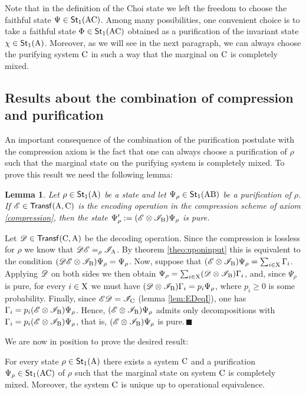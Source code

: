 \documentclass[12pt,aps,pra,showpacs,groupedaddress]{revtex4-1}
\newtheorem{lemma}{Lemma} \newtheorem{proposition}{Proposition}
\def\Proof{\medskip\par\noindent{\bf Proof. }}
\def\qed{$\,\blacksquare$\par}
\def\rB{{\rm B}}
\def\rC{{\rm C}}
\def\Stset{{\mathsf{St}}}
\def\Trnset{{\mathsf{Transf}}}
\begin{document}
Note that in the definition of the Choi state we left the freedom to choose the
faithful state $\Psi \in\Stset_1 (\rA\rC)$.  Among many possibilities, one convenient choice is to
take a faithful state $\Phi \in\Stset_1 (\rA\rC)$ obtained as a purification of the invariant state
$\chi \in\Stset_1 (\rA)$. Moreover, as we will see in the next paragraph, we can always choose the
purifying system $\rC$ in such a way that the marginal on $\rC$ is completely
mixed.
  



\subsection{Results about the combination of compression and purification}


An important consequence of the combination of the purification postulate with the compression axiom
is the fact that one can always choose a purification of $\rho$ such that the marginal state on the
purifying system is completely mixed.  To prove this result we need the following lemma:


\begin{lemma}
  Let $\rho \in\Stset_1 (\rA)$ be a state and let $\Psi_\rho \in\Stset_1(\rA\rB)$ be a purification of
  $\rho$.  If $\tE\in\Trnset(\rA,\rC)$ is the encoding operation in the compression scheme of axiom
  \ref{compression}, then the state $\Psi_\rho' := (\tE\otimes\tI_\rB) \Psi_\rho$ is pure.
  \label{lem:pure}
\end{lemma}


\Proof Let $\tD \in \Trnset (\rC, \rA)$ be the decoding operation.  Since the compression is
lossless for $\rho$ we know that $\mathscr D\mathscr E =_\rho \mathscr I_{\rm A}$.  By theorem \ref{theo:uponinput} this is
equivalent to the condition $(\tD\tE\otimes\tI_\rB)\Psi_\rho=\Psi_\rho$.  Now, suppose that
$(\tE\otimes\tI_\rB )\Psi_\rho=\sum_{i\in\rX} \Gamma_i$. Applying $\mathscr D$ on both sides we then obtain
$ \Psi_\rho = \sum_{i \in \rX} (\tD \otimes \tI_\rB) \Gamma_i $, and, since $\Psi_\rho$ is pure, for
every $i \in {\rm X}$ we must have $(\tD\otimes\tI_\rB)\Gamma_i=p_i \Psi_\rho$, where $p_i\ge0$ is some
probability.  Finally, since $\tE\tD=\tI_{\rC}$ (lemma \ref{lem:EDeqI}), one has $\Gamma_i=p_i(
\tE\otimes\tI_\rB)\Psi_\rho$. Hence, $(\tE\otimes\tI_\rB)\Psi_\rho$ admits only decompositions with
$\Gamma_i=p_i (\tE\otimes\tI_\rB) \Psi_\rho$, that is, $(\tE\otimes\tI_\rB) \Psi_\rho$ is pure.\qed
 
 
 We are now in position to prove the desired result: 
\begin{theorem}
  For every state $\rho\in\Stset_1(\rA)$ there exists a system $\rC$ and a purification
  $\Psi_\rho\in\Stset_1(\rA \rC)$ of $\rho$ such that the marginal state on system $\rC$ is
  completely mixed. Moreover, the system $\rC$ is unique up to operational equivalence.
  \label{theo:conjusys}
\end{theorem}
\end{document}
